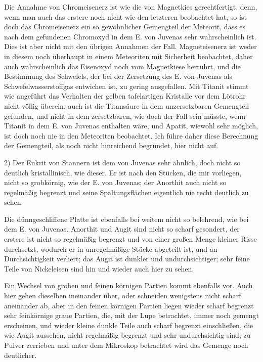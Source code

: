\documentclass[a4paper, 11pt, oneside]{article}
\begin{document}
Die Annahme von Chromeisenerz ist wie die von Magnetkies gerechtfertigt, denn, wenn man auch das erstere noch nicht wie den letzteren beobachtet hat, so ist doch das Chromeisenerz ein so gewöhnlicher Gemengteil der Meteorit, dass es nach dem gefundenen Chromoxyd in dem E. von Juvenas sehr wahrscheinlich ist. Dies ist aber nicht mit den übrigen Annahmen der Fall. Magneteisenerz ist weder in diesem noch überhaupt in einem Meteoriten mit Sicherheit beobachtet, daher auch wahrscheinlich das Eisenoxyd noch vom Magnetkiese herrührt, und die Bestimmung des Schwefels, der bei der Zersetzung des E. von Juvenas als Schwefelwasserstoffgas entwichen ist, zu gering ausgefallen. Mit Titanit stimmt wie angeführt das Verhalten der gelben tafelartigen Kristalle vor dem Lötrohr nicht völlig überein, auch ist die Titansäure in dem unzersetzbaren Gemengteil gefunden, und nicht in dem zersetzbaren, wie doch der Fall sein müsste, wenn Titanit in dem E. von Juvenas enthalten wäre, und Apatit, wiewohl sehr möglich, ist doch noch nie in den Meteoriten beobachtet. Ich führe daher diese Berechnung der Gemengteil, als noch nicht hinreichend begründet, hier nicht auf.

2) Der Eukrit von Stannern ist dem von Juvenas sehr ähnlich, doch nicht so deutlich kristallinisch, wie dieser. Er ist nach den Stücken, die mir vorliegen, nicht so grobkörnig, wie der E. von Juvenas; der Anorthit auch nicht so regelmäßig begrenzt und seine Spaltungsflächen eigentlich nie recht deutlich zu sehen.

Die dünngeschliffene Platte ist ebenfalls bei weitem nicht so belehrend, wie bei dem E. von Juvenas. Anorthit und Augit sind nicht so scharf gesondert, der erstere ist nicht so regelmäßig begrenzt und von einer großen Menge kleiner Risse durchsetzt, wodurch er in unregelmäßige Stücke abgeteilt ist, und an Durchsichtigkeit verliert; das Augit ist dunkler und undurchsichtiger; sehr feine Teile von Nickeleisen sind hin und wieder auch hier zu sehen.

Ein Wechsel von groben und feinen körnigen Partien kommt ebenfalls vor. Auch hier gehen dieselben ineinander über, oder schneiden wenigstens nicht scharf aneinander ab, aber in den feinen körnigen Partien liegen wieder scharf begrenzt sehr feinkörnige graue Partien, die, mit der Lupe betrachtet, immer noch gemengt erscheinen, und wieder kleine dunkle Teile auch scharf begrenzt einschließen, die wie Augit aussehen, nicht regelmäßig begrenzt und sehr undurchsichtig sind; zu Pulver zerrieben und unter dem Mikroskop betrachtet wird das Gemenge noch deutlicher.
\end{document}
